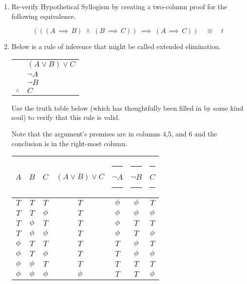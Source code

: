 \documentclass{amsart}
\begin{document}
\begin{enumerate}
\vfill

\newpage

\item Re-verify Hypothetical Syllogism by creating a two-column proof for the following equivalence.

\[ \left( ( (A\, \implies\, B) \; \land \; (B\, \implies\, C )) \; \implies \;(A\, \implies \,C) \right) \quad \cong \quad t \]

\vfill


\newpage

\item Below is a rule of inference that might be called extended elimination.

\begin{tabular}{cl}
 & $(A \lor B) \lor C$ \\
 & ${\lnot}A$ \\
 & ${\lnot}B$ \\ \hline
$\therefore$ & $C$ \\
\end{tabular}

Use the truth table below (which has thoughtfully been filled in by some kind soul) to verify that this rule is valid.

Note that the argument's 
premises are in columns 4,5, and 6 and the conclusion is in the right-most column.  

\vspace{.5in}

\begin{tabular}{|c|c|c||c|c|c||c|} \hline
\rule[-8pt]{0pt}{30pt}$A$ & $B$ & $C$ & $(A \lor B) \lor C$ & \rule{20pt}{0pt} ${\lnot}A$ \rule{20pt}{0pt} & \rule{20pt}{0pt} ${\lnot}B$ \rule{20pt}{0pt} & \rule{20pt}{0pt} $C$ \rule{20pt}{0pt} \\ \hline
\rule[-8pt]{0pt}{30pt}$T$ & $T$ & $T$ & $T$ & $\phi$ & $\phi$ & $T$  \\ \hline
\rule[-8pt]{0pt}{30pt}$T$ & $T$ & $\phi$  & $T$ & $\phi$ & $\phi$ & $\phi$   \\ \hline
\rule[-8pt]{0pt}{30pt}$T$ & $\phi$  & $T$ & $T$ & $\phi$ & $T$  & $T$  \\ \hline
\rule[-8pt]{0pt}{30pt}$T$ & $\phi$  & $\phi$  & $T$ & $\phi$ & $T$ & $\phi$   \\  \hline
\rule[-8pt]{0pt}{30pt}$\phi$  & $T$ & $T$ & $T$ & $T$ & $\phi$ &  $T$ \\ \hline
\rule[-8pt]{0pt}{30pt}$\phi$  & $T$ & $\phi$  & $T$ & $T$ & $\phi$ & $\phi$  \\ \hline
\rule[-8pt]{0pt}{30pt}$\phi$  & $\phi$  & $T$ & $T$ & $T$ & $T$ & $T$  \\ \hline
\rule[-8pt]{0pt}{30pt}$\phi$  & $\phi$  & $\phi$  & $\phi$ & $T$ & $T$ & $\phi$  \\  \hline
\end{tabular}



\end{enumerate}
\end{document}
